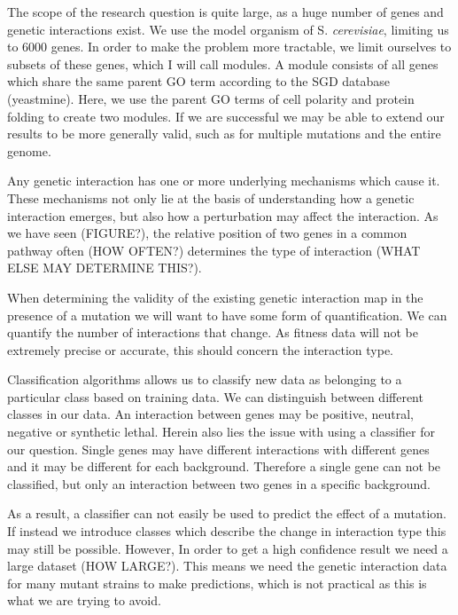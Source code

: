 \documentclass{article}
\begin{document}
The scope of the research question is quite large, as a huge number of genes and genetic interactions exist. We use the model organism of S. \textit{cerevisiae}, limiting us to 6000 genes. In order to make the problem more tractable, we limit ourselves to subsets of these genes, which I will call modules. A module consists of all genes which share the same parent GO term according to the SGD database (yeastmine). Here, we use the parent GO terms of cell polarity and protein folding to create two modules. If we are successful we may be able to extend our results to be more generally valid, such as for multiple mutations and the entire genome. 

Any genetic interaction has one or more underlying mechanisms which cause it. These mechanisms not only lie at the basis of understanding how a genetic interaction emerges, but also how a perturbation may affect the interaction. As we have seen (FIGURE?), the relative position of two genes in a common pathway often (HOW OFTEN?) determines the type of interaction (WHAT ELSE MAY DETERMINE THIS?). 

When determining the validity of the existing genetic interaction map in the presence of a mutation we will want to have some form of quantification. We can quantify the number of interactions that change. As fitness data will not be extremely precise or accurate, this should concern the interaction type. 

Classification algorithms allows us to classify new data as belonging to a particular class based on training data. We can distinguish between different classes in our data. An interaction between genes may be positive, neutral, negative or synthetic lethal. Herein also lies the issue with using a classifier for our question. Single genes may have different interactions with different genes and it may be different for each background. Therefore a single gene can not be classified, but only an interaction between two genes in a specific background. 

As a result, a classifier can not easily be used to predict the effect of a mutation. If instead we introduce classes which describe the change in interaction type this may still be possible. However, In order to get a high confidence result we need a large dataset (HOW LARGE?). This means we need the genetic interaction data for many mutant strains to make predictions, which is not practical as this is what we are trying to avoid.
\end{document}
